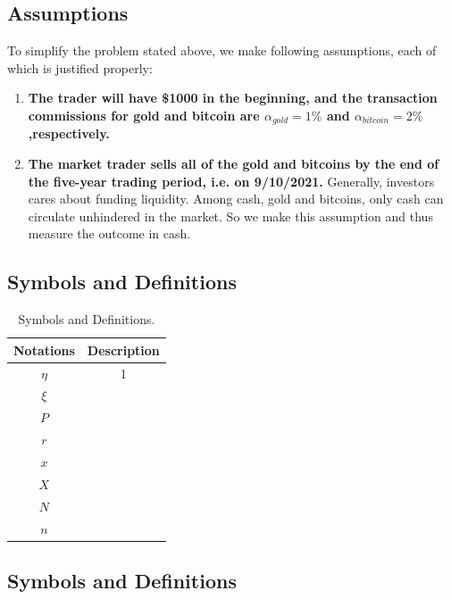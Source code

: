 \documentclass[12pt,a4paper]{article}
\begin{document}
\begin{spacing}{1.2}
\subsection{Assumptions}
To simplify the problem stated above, we make following assumptions, each of which is justified properly: 
\begin{enumerate}
	
	\item \textbf{The trader will have \$1000 in the beginning, and the transaction commissions for gold and bitcoin are $\alpha_{gold}=1\%$ and $\alpha_{bitcoin}=2\%$,respectively.}


	\item \textbf{The market trader sells all of the gold and bitcoins by the end of the five-year trading period, i.e. on 9/10/2021.} Generally, investors cares about funding liquidity. Among cash, gold and bitcoins, only cash can circulate unhindered in the market. So we make this assumption and thus measure the outcome in cash.
	
\end{enumerate}


\subsection{Symbols and Definitions}

\begin{table}[H]
\renewcommand{\arraystretch}{1.5}
\caption{Symbols and Definitions.}
\label{Table_Symbols}
\begin{center}
{\footnotesize
\begin{tabular}{c c}
\toprule
{Notations} & {Description} \\
\midrule
{$\eta$}    & {1} \\ 
{$\xi$}     & {} \\ 
$P$   & {} \\ 
$r$     & {} \\
$x$     & {} \\ 
$X$     & {} \\ 
$N$    & {} \\ 
$n$     & {} \\ 
\bottomrule
\end{tabular}}
\end{center}
\end{table}


\subsection{Symbols and Definitions}


\end{spacing}
\end{document}
